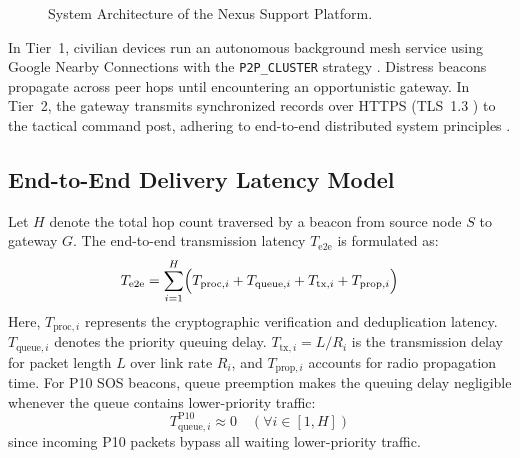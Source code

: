 \documentclass[conference,a4paper]{IEEEtran}
\begin{document}
\begin{figure}[htbp]
\caption{System Architecture of the Nexus Support Platform.}
\label{fig:sys_arch}
\end{figure}

In Tier~1, civilian devices run an autonomous background mesh service using Google Nearby Connections with the \texttt{P2P\_CLUSTER} strategy \cite{4}. Distress beacons propagate across peer hops until encountering an opportunistic gateway. In Tier~2, the gateway transmits synchronized records over HTTPS (TLS~1.3 \cite{12}) to the tactical command post, adhering to end-to-end distributed system principles \cite{18}.

\subsection{End-to-End Delivery Latency Model}
Let $H$ denote the total hop count traversed by a beacon from source node $S$ to gateway $G$. The end-to-end transmission latency $T_{\text{e2e}}$ is formulated as:
\begin{equation}
T_{\text{e2e}} = \sum_{i=1}^{H} \Bigl( T_{\text{proc}, i} + T_{\text{queue}, i} + T_{\text{tx}, i} + T_{\text{prop}, i} \Bigr)
\label{eq:latency}
\end{equation}
Here, $T_{\text{proc}, i}$ represents the cryptographic verification and deduplication latency. $T_{\text{queue}, i}$ denotes the priority queuing delay. $T_{\text{tx}, i} = L / R_i$ is the transmission delay for packet length $L$ over link rate $R_i$, and $T_{\text{prop}, i}$ accounts for radio propagation time. For P10 SOS beacons, queue preemption makes the queuing delay negligible whenever the queue contains lower-priority traffic:
\begin{equation}
T_{\text{queue}, i}^{\text{P10}} \approx 0 \quad (\forall i \in [1, H])
\label{eq:p10_latency}
\end{equation}
since incoming P10 packets bypass all waiting lower-priority traffic.
\end{document}
